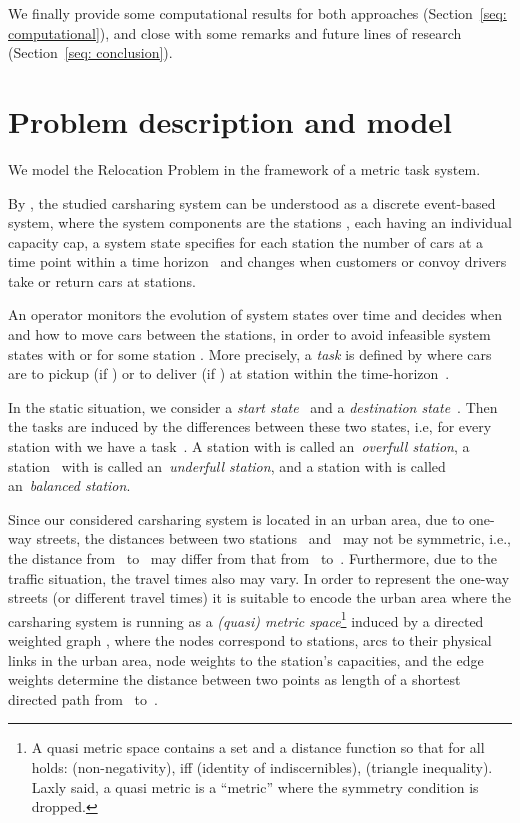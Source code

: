 \documentclass[english]{llncs}
\numberwithin{sublemma}{lemma}
\begin{document}
We finally provide some computational results for both approaches (Section~\ref{seq: computational}), and close with some remarks and future lines of research (Section~\ref{seq: conclusion}).






\section{Problem description and model}
\label{sec: model}


We model the Relocation Problem in the framework of a metric task system. 

By \cite{LAGOS2013}, the studied carsharing system can be understood as a discrete event-based system, where
the system components are the stations , each having an individual capacity cap,
a system state  specifies for each station  the number of cars  at a time point  within a time horizon~ 
and  changes when customers or convoy drivers take or return cars at stations. 


An operator monitors the evolution of system states over time and decides when and how to move cars
between the stations,
in order to avoid infeasible system states  with  or  for some station .
More precisely, a \emph{task} is defined by  where  cars are to pickup (if ) or to deliver (if ) at station  within the time-horizon~. 


In the static situation, we consider a \emph{start state}~ and a \emph{destination state}~.
Then the tasks are induced by the differences between these two states, i.e, for every station  with  we have a task~.
A station  with  is called an~\emph{overfull station}, a station~ with  is called an~\emph{underfull station},
and a station  with  is called an~\emph{balanced station}.


Since our considered carsharing system is located in an urban area, due to one-way streets, the distances between two stations~ and~ may not be symmetric, i.e.,
the distance from~ to~ 
may differ from that from~ to~.
Furthermore, due to the traffic situation, the travel times also may vary.
In order to represent the one-way streets (or different travel times) it is suitable to encode the urban area where the carsharing system is running as a
\emph{(quasi) metric space}\footnote{A quasi metric space  contains a set  and a distance function  so that for all  holds:
  (non-negativity),   iff  (identity of indiscernibles),   (triangle inequality).
Laxly said, a quasi metric is a ``metric'' where the symmetry condition is dropped.}
 induced by a directed weighted graph , where the nodes correspond to stations, arcs to their physical links in the urban area, node weights to the station's capacities,
and the edge weights  determine the distance  between two points  as length of a shortest directed path from~ to~.
\end{document}
